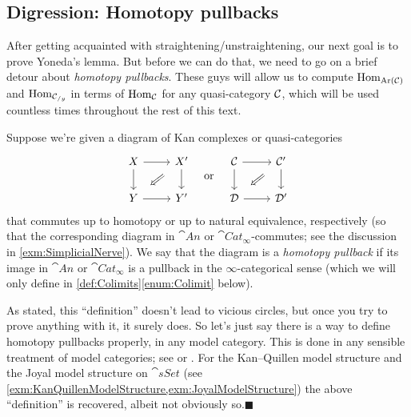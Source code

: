 \subsection{Digression: Homotopy pullbacks}\label{subsec:HomotopyPullbacks}
After getting acquainted with straightening/unstraightening, our next goal is to prove Yoneda's lemma. But before we can do that, we need to go on a brief detour about \emph{homotopy pullbacks}. These guys will allow us to compute $\operatorname{Hom}_{\operatorname{Ar}(\mathcal{C})}$ and $\operatorname{Hom}_{\mathcal{C}_{/y}}$ in terms of $\operatorname{Hom}_{\mathcal{C}}$ for any quasi-category $\mathcal{C}$, which will be used countless times throughout the rest of this text. 
\begin{numpar}\label{def:HomotopyPullback}
	Suppose we're given a diagram of Kan complexes or quasi-categories
	\begin{equation*}
		\begin{tikzcd}
			X\rar\dar & X'\dlar[phantom,"\Longleftarrow"{sloped}]\dar\\
			Y\rar & Y'
		\end{tikzcd}\quad\text{or}\quad
		\begin{tikzcd}
			\Cc\rar\dar & \Cc'\dlar[phantom,"\Longleftarrow"{sloped}]\dar\\
			\Dd\rar & \Dd'
		\end{tikzcd}
	\end{equation*}
	that commutes up to homotopy or up to natural equivalence, respectively (so that the corresponding diagram in $\cat{An}$ or $\cat{Cat}_\infty$-commutes; see the discussion in \cref{exm:SimplicialNerve}). We say that the diagram is a \emph{homotopy pullback} if its image in $\cat{An}$ or $\cat{Cat}_\infty$ is a pullback in the $\infty$-categorical sense (which we will only define in \cref{def:Colimits}\cref{enum:Colimit} below).
	
	As stated, this \enquote{definition} doesn't lead to vicious circles, but once you try to prove anything with it, it surely does. So let's just say there is a way to define homotopy pullbacks properly, in any model category. This is done in any sensible treatment of model categories; see \cite[Definition~{\href{https://cisinski.app.uni-regensburg.de/CatLR.pdf\#thm.2.3.22}{2.3.22}}]{Cisinski} or \cite[Definition~VIII.49(vi)]{HigherCatsII}. For the Kan--Quillen model structure and the Joyal model structure on $\cat{sSet}$ (see \cref{exm:KanQuillenModelStructure,exm:JoyalModelStructure}) the above \enquote{definition} is recovered, albeit not obviously so.\hfill$\blacksquare$
\end{numpar}
